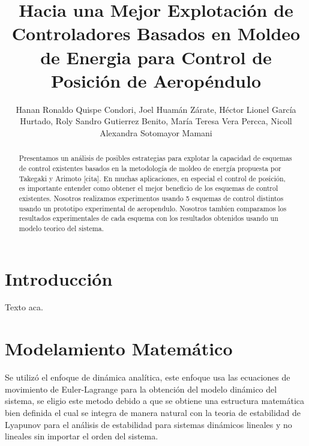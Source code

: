 \documentclass[a4paper]{IEEEtran} %
\begin{document}
\title{Hacia una Mejor Explotación de Controladores Basados en Moldeo de Energia para Control de Posición de Aeropéndulo}
\author{Hanan Ronaldo Quispe Condori, Joel Huamán Zárate, Héctor Lionel García Hurtado, Roly Sandro Gutierrez Benito, María Teresa Vera Percca, Nicoll Alexandra Sotomayor Mamani}
\maketitle
\begin{abstract}
    Presentamos un análisis de posibles estrategias para explotar la capacidad de esquemas de control existentes basados en la metodología de moldeo de energía propuesta por Takegaki y Arimoto [cita]. En muchas aplicaciones, en especial el control de posición, es importante entender como obtener el mejor beneficio de los esquemas de control existentes. Nosotros realizamos experimentos usando 5 esquemas de control distintos usando un prototipo experimental de aeropendulo. Nosotros tambien comparamos los resultados experimentales de cada esquema con los resultados obtenidos usando un modelo teorico del sistema.
\end{abstract}
\section{Introducción}
Texto aca\cite{gunnel2017tuning}.
\section{Modelamiento Matemático}
\label{sec:modeling}
Se utilizó el enfoque de dinámica analítica, este enfoque usa las ecuaciones de movimiento de Euler-Lagrange para la obtención del modelo dinámico del sistema, se eligio este metodo debido a que se obtiene una estructura matemática bien definida el cual se integra de manera natural con la teoria de estabilidad de Lyapunov para el análisis de estabilidad para sistemas dinámicos lineales y no lineales sin importar el orden del sistema.\cite{reyes2019drones}
\end{document}
